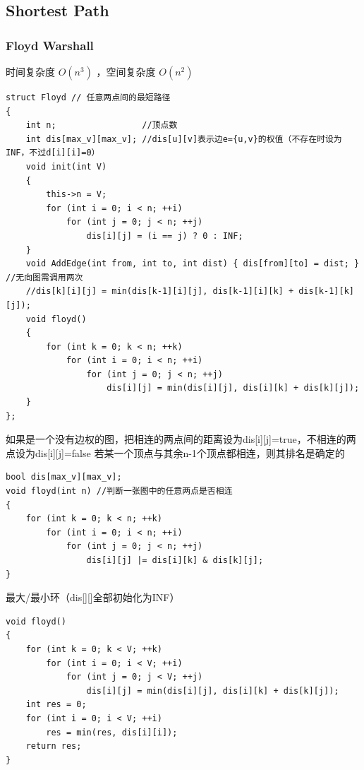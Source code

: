 \documentclass[twoside]{article}
\begin{document}
\subsection{Shortest Path}
\subsubsection{Floyd Warshall}
时间复杂度 $O(n^3)$ ，空间复杂度 $O(n^2)$
\begin{lstlisting}
struct Floyd // 任意两点间的最短路径
{
    int n;                 //顶点数
    int dis[max_v][max_v]; //dis[u][v]表示边e={u,v}的权值（不存在时设为INF，不过d[i][i]=0）
    void init(int V)
    {
        this->n = V;
        for (int i = 0; i < n; ++i)
            for (int j = 0; j < n; ++j)
                dis[i][j] = (i == j) ? 0 : INF;
    }
    void AddEdge(int from, int to, int dist) { dis[from][to] = dist; } //无向图需调用两次
    //dis[k][i][j] = min(dis[k-1][i][j], dis[k-1][i][k] + dis[k-1][k][j]);
    void floyd()
    {
        for (int k = 0; k < n; ++k)
            for (int i = 0; i < n; ++i)
                for (int j = 0; j < n; ++j)
                    dis[i][j] = min(dis[i][j], dis[i][k] + dis[k][j]);
    }
};
\end{lstlisting}
如果是一个没有边权的图，把相连的两点间的距离设为dis[i][j]=true，不相连的两点设为dis[i][j]=false
若某一个顶点与其余n-1个顶点都相连，则其排名是确定的
\begin{lstlisting}
bool dis[max_v][max_v];
void floyd(int n) //判断一张图中的任意两点是否相连
{
    for (int k = 0; k < n; ++k)
        for (int i = 0; i < n; ++i)
            for (int j = 0; j < n; ++j)
                dis[i][j] |= dis[i][k] & dis[k][j];
}
\end{lstlisting}
最大/最小环（dis[][]全部初始化为INF）
\begin{lstlisting}
void floyd()
{
    for (int k = 0; k < V; ++k)
        for (int i = 0; i < V; ++i)
            for (int j = 0; j < V; ++j)
                dis[i][j] = min(dis[i][j], dis[i][k] + dis[k][j]);
    int res = 0;
    for (int i = 0; i < V; ++i)
        res = min(res, dis[i][i]);
    return res;
}
\end{lstlisting}
\end{document}

